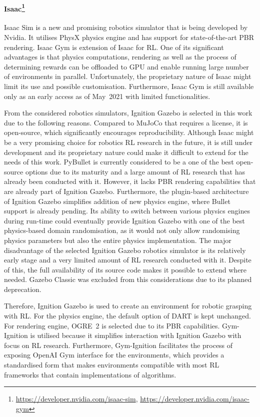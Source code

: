 \paragraph{Isaac\protect\footnote{\href{https://developer.nvidia.com/isaac-sim}{https://developer.nvidia.com/isaac-sim}, \href{https://developer.nvidia.com/isaac-gym}{https://developer.nvidia.com/isaac-gym}}} Isaac Sim is a new and promising robotics simulator that is being developed by Nvidia. It utilises PhysX physics engine and has support for state-of-the-art PBR rendering. Isaac Gym is extension of Isaac for RL. One of its significant advantages is that physics computations, rendering as well as the process of determining rewards can be offloaded to GPU and enable running large number of environments in parallel. Unfortunately, the proprietary nature of Isaac might limit its use and possible customisation. Furthermore, Isaac Gym is still available only as an early access as of May~2021 with limited functionalities.

\bigskip

From the considered robotics simulators, Ignition Gazebo is selected in this work due to the following reasons. Compared to MuJoCo that requires a license, it is open-source, which significantly encourages reproducibility. Although Isaac might be a very promising choice for robotics RL research in the future, it is still under development and its proprietary nature could make it difficult to extend for the needs of this work. PyBullet is currently considered to be a one of the best open-source options due to its maturity and a large amount of RL research that has already been conducted with it. However, it lacks PBR rendering capabilities that are already part of Ignition Gazebo. Furthermore, the plugin-based architecture of Ignition Gazebo simplifies addition of new physics engine, where Bullet support is already pending. Its ability to switch between various physics engines during run-time could eventually provide Ignition Gazebo with one of the best physics-based domain randomisation, as it would not only allow randomising physics parameters but also the entire physics implementation. The major disadvantage of the selected Ignition Gazebo robotics simulator is its relatively early stage and a very limited amount of RL research conducted with it. Despite of this, the full availability of its source code makes it possible to extend where needed. Gazebo Classic was excluded from this considerations due to its planned deprecation.

Therefore, Ignition Gazebo is used to create an environment for robotic grasping with RL. For the physics engine, the default option of DART is kept unchanged. For rendering engine, OGRE~2 is selected due to its PBR capabilities. Gym-Ignition \cite{ferigo_gym-ignition_2020} is utilised because it simplifies interaction with Ignition Gazebo with focus on RL research. Furthermore, Gym-Ignition facilitates the process of exposing OpenAI Gym interface for the environments, which provides a standardised form that makes environments compatible with most RL frameworks that contain implementations of algorithms.


